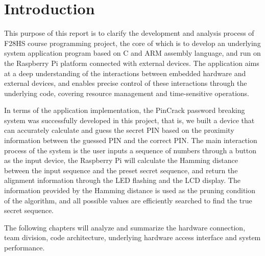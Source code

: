 \section{Introduction}
\label{sec:introduction}

This purpose of this report is to clarify the development and analysis process of F28HS course programming project, the core of which is to develop an underlying system application program based on C and ARM assembly language, and run on the Raspberry Pi platform connected with external devices. The application aims at a deep understanding of the interactions between embedded hardware and external devices, and enables precise control of these interactions through the underlying code, covering resource management and time-sensitive operations.

In terms of the application implementation, the PinCrack password breaking system was successfully developed in this project, that is, we built a device that can accurately calculate and guess the secret PIN based on the proximity information between the guessed PIN and the correct PIN. The main interaction process of the system is the user inputs a sequence of numbers through a button as the input device, the Raspberry Pi will calculate the Hamming distance between the input sequence and the preset secret sequence, and return the alignment information through the LED flashing and the LCD display. The information provided by the Hamming distance is used as the pruning condition of the algorithm, and all possible values are efficiently searched to find the true secret sequence.

The following chapters will analyze and summarize the hardware connection, team division, code architecture, underlying hardware access interface and system performance.
